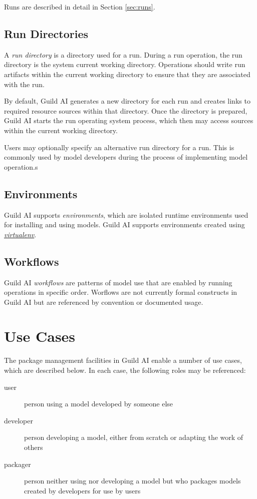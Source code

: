 \documentclass{article}
\begin{document}
Runs are described in detail in Section \ref{sec:runs}.

\subsection{Run Directories}
\label{sec:run-dir}

A \emph{run directory} is a directory used for a run. During a run
operation, the run directory is the system current working
directory. Operations should write run artifacts within the current
working directory to ensure that they are associated with the run.

By default, Guild AI generates a new directory for each run and
creates links to required resource sources within that directory. Once
the directory is prepared, Guild AI starts the run operating system
process, which then may access sources within the current working
directory.

Users may optionally specify an alternative run directory for a
run. This is commonly used by model developers during the process of
implementing model operation.s

\subsection{Environments}

Guild AI supports \emph{environments}, which are isolated runtime
environments used for installing and using models. Guild AI supports
environments created using
\href{https://virtualenv.pypa.io}{\emph{virtualenv}}.

\subsection{Workflows}

Guild AI \emph{workflows} are patterns of model use that are enabled
by running operations in specific order. Worflows are not currently
formal constructs in Guild AI but are referenced by convention or
documented usage.

\section{Use Cases}
\label{sec:use-cases}

The package management facilities in Guild AI enable a number of use
cases, which are described below. In each case, the following roles
may be referenced:

\begin{description}
\item[user] person using a model developed by someone else
\item[developer] person developing a model, either from scratch or
  adapting the work of others
\item[packager] person neither using nor developing a model but who
  packages models created by developers for use by users
\end{description}
\end{document}
